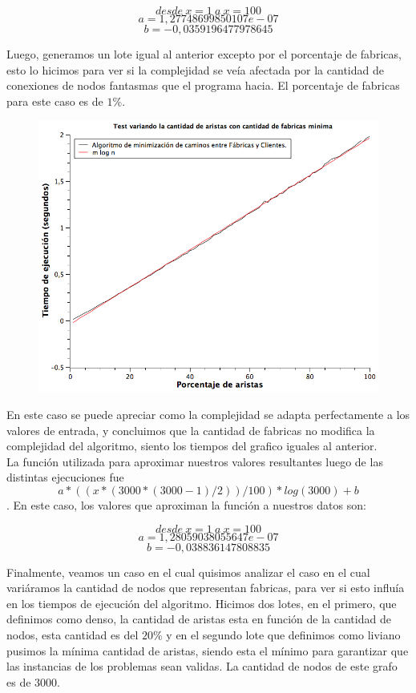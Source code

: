 $$desde\ x = 1\ a\ x = 100 $$
$$a  = 1,27748699850107e-07$$
$$b  = -0,0359196477978645 $$

\newpage
Luego, generamos un lote igual al anterior excepto por el porcentaje de fabricas, esto lo hicimos para ver si la complejidad se veía afectada por la cantidad de conexiones de nodos fantasmas que el programa hacia. El porcentaje de fabricas para este caso es de $1\%$.

\begin{figure}[H]
	\includegraphics[width=400pt]{../tests/ej3/EJ3-r-var-liviano.png}
\end{figure}

En este caso se puede apreciar como la complejidad se adapta perfectamente a los valores de entrada, y concluimos que la cantidad de fabricas no modifica la complejidad del algoritmo, siento los tiempos del grafico iguales al anterior.\\
La función utilizada para aproximar nuestros valores resultantes luego de las distintas ejecuciones fue $$ a*((x*(3000*(3000-1)/2))/100)*log(3000)+b$$.
En este caso, los valores que aproximan la función a nuestros datos son:

$$desde\ x = 1\ a\ x = 100$$
$$a  = 1,28059038055647e-07$$
$$b  = -0,038836147808835$$

\newpage 
Finalmente, veamos un caso en el cual quisimos analizar el caso en el cual variáramos la cantidad de nodos que representan fabricas, para ver si esto influía en los tiempos de ejecución del algoritmo. Hicimos dos lotes, en el primero, que definimos como denso, la cantidad de aristas esta en función de la cantidad de nodos, esta cantidad es del $20\%$ y en el segundo lote que definimos como liviano pusimos la mínima cantidad de aristas, siendo esta el mínimo para garantizar que las instancias de los problemas sean validas. La cantidad de nodos de este grafo es de $3000$.

